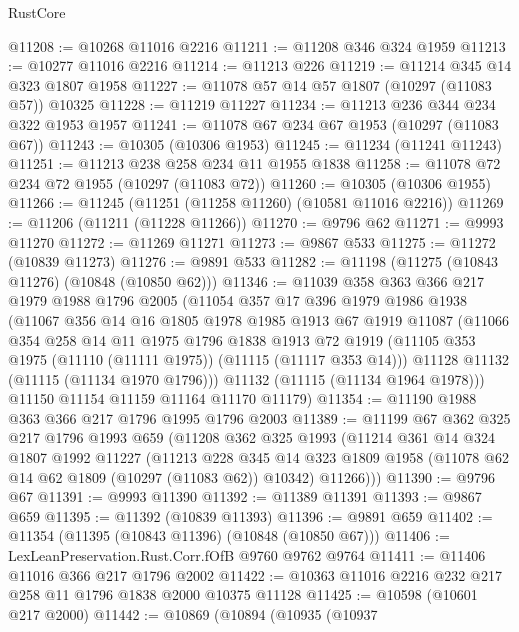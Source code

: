 \begin{lexlean}{RustCore}
\begin{coremodule}
@11208 := @10268 @11016 @2216
@11211 := @11208 @346 @324 @1959
@11213 := @10277 @11016 @2216
@11214 := @11213 @226
@11219 := @11214 @345 @14 @323 @1807 @1958
@11227 := @11078 @57 @14 @57 @1807 (@10297 (@11083 @57)) @10325
@11228 := @11219 @11227
@11234 := @11213 @236 @344 @234 @322 @1953 @1957
@11241 := @11078 @67 @234 @67 @1953 (@10297 (@11083 @67))
@11243 := @10305 (@10306 @1953)
@11245 := @11234 (@11241 @11243)
@11251 := @11213 @238 @258 @234 @11 @1955 @1838
@11258 := @11078 @72 @234 @72 @1955 (@10297 (@11083 @72))
@11260 := @10305 (@10306 @1955)
@11266 := @11245 (@11251 (@11258 @11260) (@10581 @11016 @2216))
@11269 := @11206 (@11211 (@11228 @11266))
@11270 := @9796 @62
@11271 := @9993 @11270
@11272 := @11269 @11271
@11273 := @9867 @533
@11275 := @11272 (@10839 @11273)
@11276 := @9891 @533
@11282 := @11198 (@11275 (@10843 @11276) (@10848 (@10850 @62)))
@11346 := @11039
    @358
    @363
    @366
    @217
    @1979
    @1988
    @1796
    @2005
    (@11054
      @357
      @17
      @396
      @1979
      @1986
      @1938
      (@11067
        @356
        @14
        @16
        @1805
        @1978
        @1985
        @1913
        @67
        @1919
        @11087
        (@11066
          @354
          @258
          @14
          @11
          @1975
          @1796
          @1838
          @1913
          @72
          @1919
          (@11105 @353 @1975 (@11110 (@11111 @1975)) (@11115 (@11117 @353 @14)))
          @11128
          @11132
          (@11115 (@11134 @1970 @1796)))
        @11132
        (@11115 (@11134 @1964 @1978)))
      @11150
      @11154
      @11159
      @11164
      @11170
      @11179)
@11354 := @11190 @1988 @363 @366 @217 @1796 @1995 @1796 @2003
@11389 := @11199
    @67
    @362
    @325
    @217
    @1796
    @1993
    @659
    (@11208
      @362
      @325
      @1993
      (@11214
        @361
        @14
        @324
        @1807
        @1992
        @11227
        (@11213
          @228
          @345
          @14
          @323
          @1809
          @1958
          (@11078 @62 @14 @62 @1809 (@10297 (@11083 @62)) @10342)
          @11266)))
@11390 := @9796 @67
@11391 := @9993 @11390
@11392 := @11389 @11391
@11393 := @9867 @659
@11395 := @11392 (@10839 @11393)
@11396 := @9891 @659
@11402 := @11354 (@11395 (@10843 @11396) (@10848 (@10850 @67)))
@11406 := LexLeanPreservation.Rust.Corr.fOfB @9760 @9762 @9764
@11411 := @11406 @11016 @366 @217 @1796 @2002
@11422 := @10363 @11016 @2216 @232 @217 @258 @11 @1796 @1838 @2000 @10375 @11128
@11425 := @10598 (@10601 @217 @2000)
@11442 := @10869
    (@10894
      (@10935
        (@10937

\end{coremodule}
\end{lexlean}

